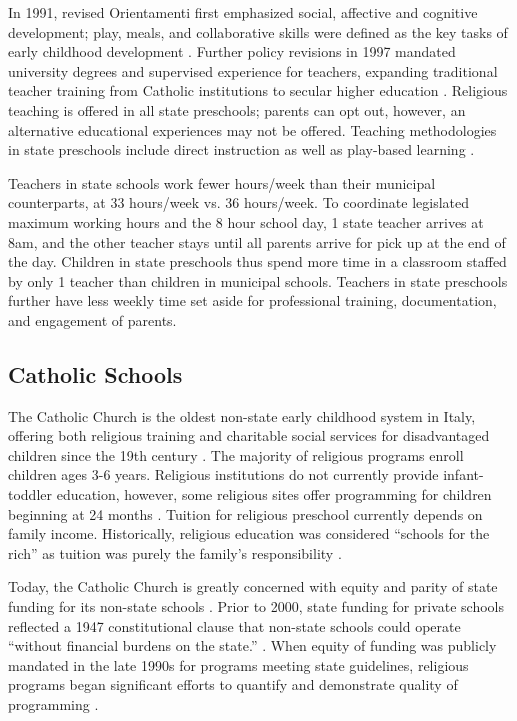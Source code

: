 In 1991, revised Orientamenti first emphasized social, affective and cognitive development; play, meals, and collaborative skills were defined as the key tasks of early childhood development \citep{Corsaro_1996_Early-Edu}. Further policy revisions in 1997 mandated university degrees and supervised experience for teachers, expanding traditional teacher training from Catholic institutions to secular higher education \citep{Ghedini_2001_Ital-Natl-Policy}. Religious teaching is offered in all state preschools; parents can opt out, however, an alternative educational experiences may not be offered. Teaching methodologies in state preschools include direct instruction as well as play-based learning \citep{CEHD_2016_Historical-Analysis}.

Teachers in state schools work fewer hours/week than their municipal counterparts, at 33 hours/week vs. 36 hours/week. To coordinate legislated maximum working hours and the 8 hour school day, 1 state teacher arrives at 8am, and the other teacher stays until all parents arrive for pick up at the end of the day. Children in state preschools thus spend more time in a classroom staffed by only 1 teacher than children in municipal schools. Teachers in state preschools further have less weekly time set aside for professional training, documentation, and engagement of parents.

\subsection{Catholic Schools}

The Catholic Church is the oldest non-state early childhood system in Italy, offering both religious training and charitable social services for disadvantaged children since the 19th century \citep{OECD_2001_Italy-Country-Note}. The majority of religious programs enroll children ages 3-6 years. Religious institutions do not currently provide infant-toddler education, however, some religious sites offer programming for children beginning at 24 months \citep{Malizia-Cicatelli_2011_BOOK_Catholic-School}. Tuition for religious preschool currently depends on family income. Historically, religious education was considered ``schools for the rich'' as tuition was purely the family's responsibility \citep{Ribolzi_2013_Italy}.

Today, the Catholic Church is greatly concerned with equity and parity of state funding for its non-state schools \citep{Malizia-Cicatelli_2011_BOOK_Catholic-School}. Prior to 2000, state funding for private schools reflected a 1947 constitutional clause that non-state schools could operate ``without financial burdens on the state.''  \citep{Hohnerlein_2009_Paradox-Public-Preschools}. When equity of funding was publicly mandated in the late 1990s for programs meeting state guidelines, religious programs began significant efforts to quantify and demonstrate quality of programming \citep{Malizia-Cicatelli_2011_BOOK_Catholic-School}. 

